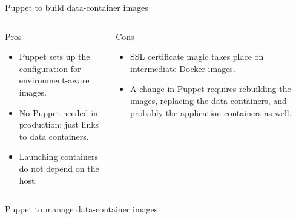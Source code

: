 \documentclass[presentation]{beamer}
\begin{document}
{
\begin{frame}[label=sec-6-4]{Puppet to build data-container images}

\begin{columns}
\begin{column}{0.5\textwidth}
\begin{block}{Pros}

\begin{itemize}
\item Puppet sets up the configuration for environment-aware images.
\item No Puppet needed in production: just links to data containers.
\item Launching containers do not depend on the host.
\end{itemize}
\end{block}
\end{column}

\begin{column}{0.5\textwidth}
\begin{block}{Cons}

\begin{itemize}
\item SSL certificate magic takes place on intermediate Docker images.
\item A change in Puppet requires rebuilding the images, replacing the data-containers, and probably the application containers as well.
\end{itemize}
\end{block}
\end{column}
\end{columns}
\end{frame}} %

{
\begin{frame}[label=sec-6-5]{Puppet to manage data-container images}

\end{frame}} %
\end{document}
